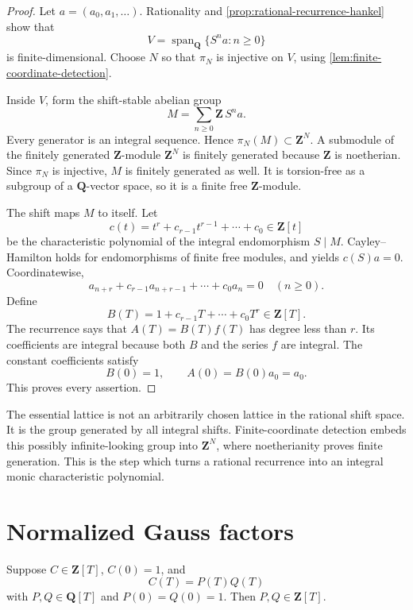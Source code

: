\begin{proof}
Let \(a=(a_0,a_1,\ldots)\).  Rationality and
\cref{prop:rational-recurrence-hankel} show that
\[
 V=\operatorname{span}_{\mathbf Q}\{S^na:n\geq0\}
\]
is finite-dimensional.  Choose \(N\) so that \(\pi_N\) is injective on
\(V\), using \cref{lem:finite-coordinate-detection}.

Inside \(V\), form the shift-stable abelian group
\[
 M=\sum_{n\geq0}\mathbf Z\,S^na.
 \tag{2.9}\label{eq:fatou-lattice}
\]
Every generator is an integral sequence.  Hence
\(\pi_N(M)\subset\mathbf Z^N\).  A submodule of the finitely generated
\(\mathbf Z\)-module \(\mathbf Z^N\) is finitely generated because
\(\mathbf Z\) is noetherian.  Since \(\pi_N\) is injective, \(M\) is
finitely generated as well.  It is torsion-free as a subgroup of a
\(\mathbf Q\)-vector space, so it is a finite free
\(\mathbf Z\)-module.

The shift maps \(M\) to itself.  Let
\[
 c(t)=t^r+c_{r-1}t^{r-1}+\cdots+c_0\in\mathbf Z[t]
\]
be the characteristic polynomial of the integral endomorphism
\(S\mid M\).  Cayley--Hamilton holds for endomorphisms of finite free
modules, and yields \(c(S)a=0\).  Coordinatewise,
\[
 a_{n+r}+c_{r-1}a_{n+r-1}+\cdots+c_0a_n=0
 \quad(n\geq0).
\]
Define
\[
 B(T)=1+c_{r-1}T+\cdots+c_0T^r\in\mathbf Z[T].
\]
The recurrence says that \(A(T)=B(T)f(T)\) has degree less than \(r\).
Its coefficients are integral because both \(B\) and the series \(f\)
are integral.  The constant coefficients satisfy
\[
 B(0)=1,\qquad A(0)=B(0)a_0=a_0.
\]
This proves every assertion.
\end{proof}

\begin{remark}
The essential lattice is not an arbitrarily chosen lattice in the
rational shift space.  It is the group generated by all integral shifts.
Finite-coordinate detection embeds this possibly infinite-looking group
into \(\mathbf Z^N\), where noetherianity proves finite generation.
This is the step which turns a rational recurrence into an integral monic
characteristic polynomial.
\end{remark}

\section{Normalized Gauss factors}

\begin{lemma}
\label{lem:normalized-gauss-factor}
Suppose \(C\in\mathbf Z[T]\), \(C(0)=1\), and
\[
 C(T)=P(T)Q(T)
\]
with \(P,Q\in\mathbf Q[T]\) and \(P(0)=Q(0)=1\).  Then
\(P,Q\in\mathbf Z[T]\).
\end{lemma}

